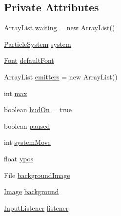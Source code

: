\subsection*{Private Attributes}
\begin{DoxyCompactItemize}
\item 
Array\+List \mbox{\hyperlink{classorg_1_1newdawn_1_1slick_1_1tools_1_1peditor_1_1_particle_game_a9367c18a64d4ce360473c18d7d81b85b}{waiting}} = new Array\+List()
\item 
\mbox{\hyperlink{classorg_1_1newdawn_1_1slick_1_1particles_1_1_particle_system}{Particle\+System}} \mbox{\hyperlink{classorg_1_1newdawn_1_1slick_1_1tools_1_1peditor_1_1_particle_game_a3a6d42e312039ae4f175e6751256f2f7}{system}}
\item 
\mbox{\hyperlink{interfaceorg_1_1newdawn_1_1slick_1_1_font}{Font}} \mbox{\hyperlink{classorg_1_1newdawn_1_1slick_1_1tools_1_1peditor_1_1_particle_game_acdd42a87a013de1e20ea48e9c6eea515}{default\+Font}}
\item 
Array\+List \mbox{\hyperlink{classorg_1_1newdawn_1_1slick_1_1tools_1_1peditor_1_1_particle_game_a85dc9d5055b69f5a7ade60036db5d668}{emitters}} = new Array\+List()
\item 
int \mbox{\hyperlink{classorg_1_1newdawn_1_1slick_1_1tools_1_1peditor_1_1_particle_game_adc975d825375ac80ddd460f0797def3c}{max}}
\item 
boolean \mbox{\hyperlink{classorg_1_1newdawn_1_1slick_1_1tools_1_1peditor_1_1_particle_game_ad055acd32b363a046861f244260245f1}{hud\+On}} = true
\item 
boolean \mbox{\hyperlink{classorg_1_1newdawn_1_1slick_1_1tools_1_1peditor_1_1_particle_game_a5023ac0e8141513700ff26420c592211}{paused}}
\item 
int \mbox{\hyperlink{classorg_1_1newdawn_1_1slick_1_1tools_1_1peditor_1_1_particle_game_a31cd56ce3d166fe6e01d7423b11f31c9}{system\+Move}}
\item 
float \mbox{\hyperlink{classorg_1_1newdawn_1_1slick_1_1tools_1_1peditor_1_1_particle_game_af74ce521a4625f8b66b8e7e54ba3b2e4}{ypos}}
\item 
File \mbox{\hyperlink{classorg_1_1newdawn_1_1slick_1_1tools_1_1peditor_1_1_particle_game_aa2b9b88381d8ce616406481d1c18a23b}{background\+Image}}
\item 
\mbox{\hyperlink{classorg_1_1newdawn_1_1slick_1_1_image}{Image}} \mbox{\hyperlink{classorg_1_1newdawn_1_1slick_1_1tools_1_1peditor_1_1_particle_game_a89c1f8f3033d852e77f6051d381510d1}{background}}
\item 
\mbox{\hyperlink{interfaceorg_1_1newdawn_1_1slick_1_1_input_listener}{Input\+Listener}} \mbox{\hyperlink{classorg_1_1newdawn_1_1slick_1_1tools_1_1peditor_1_1_particle_game_a53d1d501b82579d73d73b49f5a793b84}{listener}}
\end{DoxyCompactItemize}

